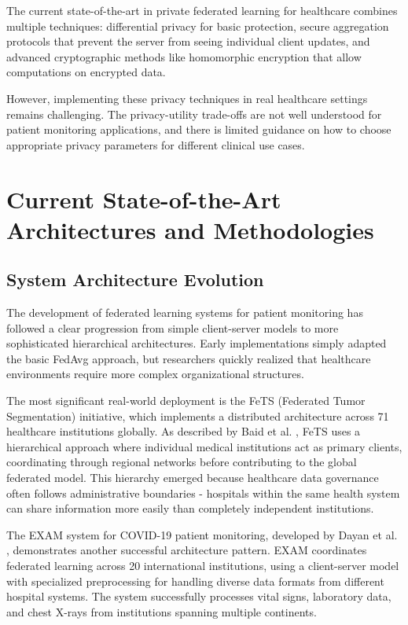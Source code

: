 \documentclass[3p,times,procedia]{elsarticle}
\begin{document}
The current state-of-the-art in private federated learning for healthcare combines multiple techniques: differential privacy for basic protection, secure aggregation protocols that prevent the server from seeing individual client updates, and advanced cryptographic methods like homomorphic encryption that allow computations on encrypted data.

However, implementing these privacy techniques in real healthcare settings remains challenging. The privacy-utility trade-offs are not well understood for patient monitoring applications, and there is limited guidance on how to choose appropriate privacy parameters for different clinical use cases.

\section{Current State-of-the-Art Architectures and Methodologies}

\subsection{System Architecture Evolution}

The development of federated learning systems for patient monitoring has followed a clear progression from simple client-server models to more sophisticated hierarchical architectures. Early implementations simply adapted the basic FedAvg approach, but researchers quickly realized that healthcare environments require more complex organizational structures.

The most significant real-world deployment is the FeTS (Federated Tumor Segmentation) initiative, which implements a distributed architecture across 71 healthcare institutions globally. As described by Baid et al. \cite{Baid2021}, FeTS uses a hierarchical approach where individual medical institutions act as primary clients, coordinating through regional networks before contributing to the global federated model. This hierarchy emerged because healthcare data governance often follows administrative boundaries - hospitals within the same health system can share information more easily than completely independent institutions.

The EXAM system for COVID-19 patient monitoring, developed by Dayan et al. \cite{Dayan2021}, demonstrates another successful architecture pattern. EXAM coordinates federated learning across 20 international institutions, using a client-server model with specialized preprocessing for handling diverse data formats from different hospital systems. The system successfully processes vital signs, laboratory data, and chest X-rays from institutions spanning multiple continents.
\end{document}
